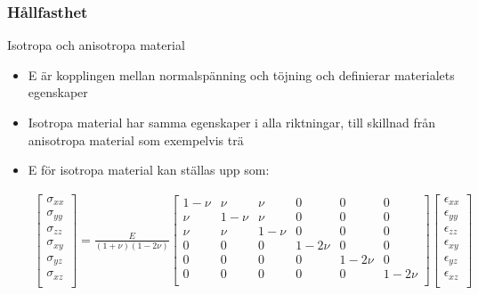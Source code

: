 \documentclass{beamer}
\begin{document}
\begin{frame}
\frametitle{Hållfasthet}
\begin{block}{Isotropa och anisotropa material}
\begin{itemize}
\item E är kopplingen mellan normalspänning och töjning och definierar materialets egenskaper
\item Isotropa material har samma egenskaper i alla riktningar, till skillnad från anisotropa material som exempelvis trä
\item E för isotropa material kan ställas upp som:
\begin{tiny}

\begin{eqnarray}\label{eqn:ststhooks}
\left[ \begin{array}{c}
\sigma_{xx} \\
\sigma_{yy} \\
\sigma_{zz} \\
\sigma_{xy} \\
\sigma_{yz} \\
\sigma_{xz} \\
\end{array} \right] = \frac{E}{(1+\nu)(1-2\nu)}
\left[ \begin{array}{cccccc}
1-\nu & \nu & \nu & 0 & 0 & 0\\
\nu & 1-\nu & \nu & 0 & 0 & 0\\
\nu & \nu & 1-\nu & 0 & 0 & 0\\
0 & 0 & 0 & 1-2\nu & 0 & 0\\
0 & 0 & 0 & 0 & 1-2\nu & 0\\
0 & 0 & 0 & 0 & 0 & 1-2\nu\\
 \end{array} \right]
\left[ \begin{array}{c}
\epsilon_{xx} \\
\epsilon_{yy} \\
\epsilon_{zz} \\
\epsilon_{xy} \\
\epsilon_{yz} \\
\epsilon_{xz} \\
\end{array} \right]
\end{eqnarray}

\end{tiny}
\end{itemize}
\end{block}
\end{frame}
\end{document}

